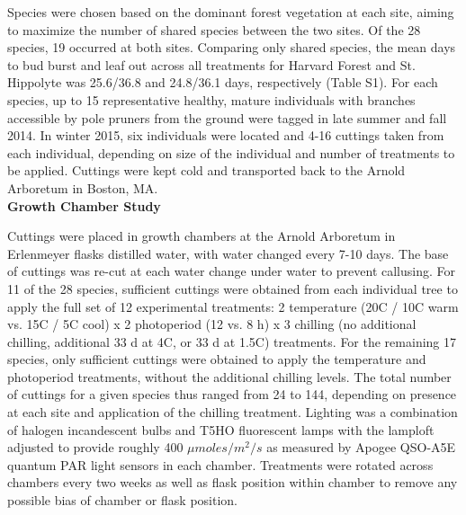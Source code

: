 \documentclass[11pt]{article}
\begin{document}
Species were chosen based on the dominant forest vegetation at each site, aiming to maximize the number of shared species between the two sites. Of the 28 species, 19 occurred at both sites. Comparing only shared species, the mean days to bud burst and leaf out across all treatments for Harvard Forest and St. Hippolyte was 25.6/36.8 and 24.8/36.1 days, respectively (Table S1). For each species, up to 15 representative healthy, mature individuals with branches accessible by pole pruners from the ground were tagged in late summer and fall 2014. In winter 2015, six individuals were located and 4-16 cuttings taken from each individual, depending on size of the individual and number of treatments to be applied. Cuttings were kept cold and transported back to the Arnold Arboretum in Boston, MA.
\vspace{1ex}\\
\noindent \textbf{Growth Chamber Study}

Cuttings were placed in growth chambers at the Arnold Arboretum in Erlenmeyer flasks distilled water, with water changed every 7-10 days. The base of cuttings was re-cut at each water change under water to prevent callusing. For 11 of the 28 species, sufficient cuttings were obtained from each individual tree to apply the full set of 12 experimental treatments: 2 temperature (20\degree C / 10\degree C warm vs. 15\degree C / 5\degree C cool) x 2 photoperiod (12 vs. 8 h) x 3 chilling (no additional chilling,  additional 33 d at 4\degree C, or 33 d at 1.5\degree C) treatments. For the remaining 17 species, only sufficient cuttings were obtained to apply the temperature and photoperiod treatments, without the additional chilling levels. The total number of cuttings for a given species thus ranged from 24 to 144, depending on presence at each site and application of the chilling treatment. Lighting was a combination of halogen incandescent bulbs and T5HO fluorescent lamps with the lamploft adjusted to provide roughly 400 $\mu moles/m^{2}/s$ as measured by Apogee QSO-A5E quantum PAR light sensors in each chamber. Treatments were rotated across chambers every two weeks as well as flask position within chamber to remove any possible bias of chamber or flask position.
\end{document}
